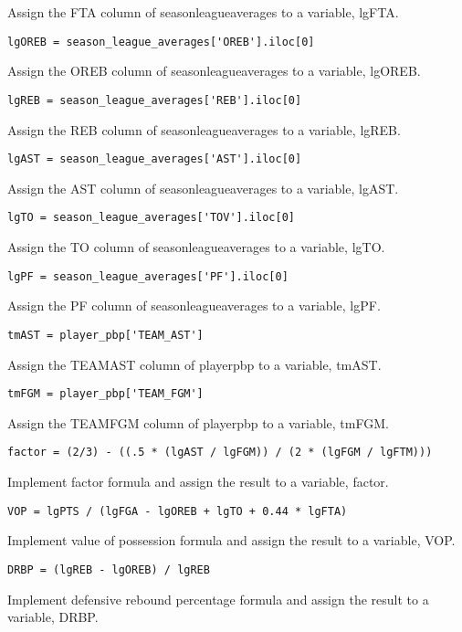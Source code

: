 \documentclass{article}
\begin{document}
Assign the FTA column of season\textunderscore league\textunderscore averages to a variable, lgFTA.
\begin{lstlisting}
lgOREB = season_league_averages['OREB'].iloc[0]
\end{lstlisting}
Assign the OREB column of season\textunderscore league\textunderscore averages to a variable, lgOREB.
\begin{lstlisting}
lgREB = season_league_averages['REB'].iloc[0]
\end{lstlisting}
Assign the REB column of season\textunderscore league\textunderscore averages to a variable, lgREB.
\begin{lstlisting}
lgAST = season_league_averages['AST'].iloc[0]
\end{lstlisting}
Assign the AST column of season\textunderscore league\textunderscore averages to a variable, lgAST.
\begin{lstlisting}
lgTO = season_league_averages['TOV'].iloc[0]
\end{lstlisting}
Assign the TO column of season\textunderscore league\textunderscore averages to a variable, lgTO.
\begin{lstlisting}
lgPF = season_league_averages['PF'].iloc[0]
\end{lstlisting}
Assign the PF column of season\textunderscore league\textunderscore averages to a variable, lgPF.
\begin{lstlisting}
tmAST = player_pbp['TEAM_AST']
\end{lstlisting}
Assign the TEAM\textunderscore AST column of player\textunderscore pbp to a variable, tmAST.
\begin{lstlisting}
tmFGM = player_pbp['TEAM_FGM']
\end{lstlisting}
Assign the TEAM\textunderscore FGM column of player\textunderscore pbp to a variable, tmFGM.
\begin{lstlisting}
factor = (2/3) - ((.5 * (lgAST / lgFGM)) / (2 * (lgFGM / lgFTM)))
\end{lstlisting}
Implement factor formula and assign the result to a variable, factor.
\begin{lstlisting}
VOP = lgPTS / (lgFGA - lgOREB + lgTO + 0.44 * lgFTA)
\end{lstlisting}
Implement value of possession formula and assign the result to a variable, VOP.
\begin{lstlisting}
DRBP = (lgREB - lgOREB) / lgREB
\end{lstlisting}
Implement defensive rebound percentage formula and assign the result to a variable, DRBP.
\end{document}

